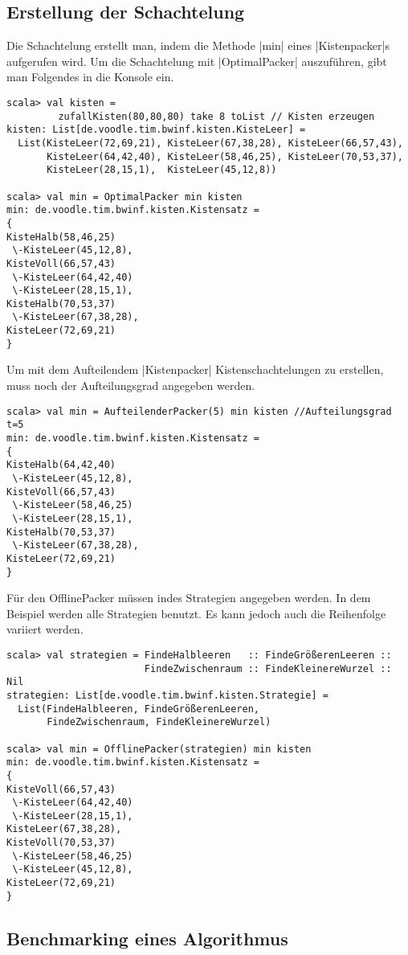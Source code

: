 \subsection{Erstellung der Schachtelung}
Die Schachtelung erstellt man, indem die Methode |min| eines |Kistenpacker|s aufgerufen wird.
Um die Schachtelung mit |OptimalPacker| auszuführen, gibt man Folgendes in die Konsole ein.
\begin{lstlisting}
scala> val kisten =
         zufallKisten(80,80,80) take 8 toList // Kisten erzeugen
kisten: List[de.voodle.tim.bwinf.kisten.KisteLeer] =
  List(KisteLeer(72,69,21), KisteLeer(67,38,28), KisteLeer(66,57,43),
       KisteLeer(64,42,40), KisteLeer(58,46,25), KisteLeer(70,53,37),
       KisteLeer(28,15,1),  KisteLeer(45,12,8))

scala> val min = OptimalPacker min kisten
min: de.voodle.tim.bwinf.kisten.Kistensatz = 
{
KisteHalb(58,46,25)
 \-KisteLeer(45,12,8),
KisteVoll(66,57,43)
 \-KisteLeer(64,42,40)
 \-KisteLeer(28,15,1),
KisteHalb(70,53,37)
 \-KisteLeer(67,38,28),
KisteLeer(72,69,21)
}
\end{lstlisting}
Um mit dem Aufteilendem |Kistenpacker| Kistenschachtelungen zu erstellen, muss noch der Aufteilungsgrad angegeben werden.
\begin{lstlisting}
scala> val min = AufteilenderPacker(5) min kisten //Aufteilungsgrad t=5
min: de.voodle.tim.bwinf.kisten.Kistensatz = 
{
KisteHalb(64,42,40)
 \-KisteLeer(45,12,8),
KisteVoll(66,57,43)
 \-KisteLeer(58,46,25)
 \-KisteLeer(28,15,1),
KisteHalb(70,53,37)
 \-KisteLeer(67,38,28),
KisteLeer(72,69,21)
}
\end{lstlisting}
Für den OfflinePacker müssen indes Strategien angegeben werden.
In dem Beispiel werden alle Strategien benutzt.
Es kann jedoch auch die Reihenfolge variiert werden.
\begin{lstlisting}
scala> val strategien = FindeHalbleeren   :: FindeGrößerenLeeren ::
                        FindeZwischenraum :: FindeKleinereWurzel :: Nil
strategien: List[de.voodle.tim.bwinf.kisten.Strategie] =
  List(FindeHalbleeren, FindeGrößerenLeeren,
       FindeZwischenraum, FindeKleinereWurzel)

scala> val min = OfflinePacker(strategien) min kisten
min: de.voodle.tim.bwinf.kisten.Kistensatz = 
{
KisteVoll(66,57,43)
 \-KisteLeer(64,42,40)
 \-KisteLeer(28,15,1),
KisteLeer(67,38,28),
KisteVoll(70,53,37)
 \-KisteLeer(58,46,25)
 \-KisteLeer(45,12,8),
KisteLeer(72,69,21)
}

\end{lstlisting}
\subsection{Benchmarking eines Algorithmus}
